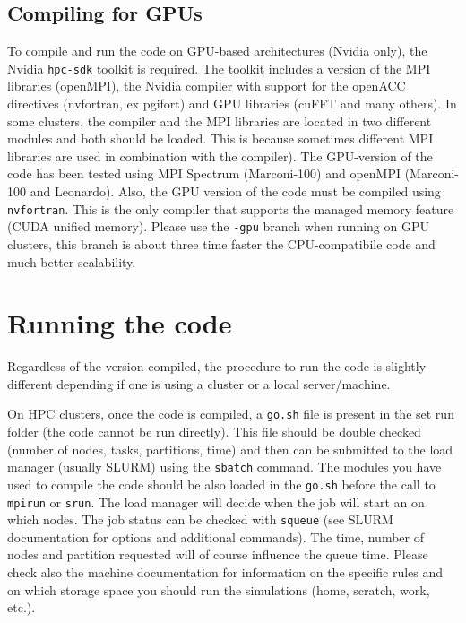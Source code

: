 \subsection{Compiling for GPUs}
To compile and run the code on GPU-based architectures (Nvidia only), the Nvidia \texttt{hpc-sdk} toolkit is required.
The toolkit includes a version of the MPI libraries (openMPI), the Nvidia compiler with support for the openACC directives (nvfortran, ex pgifort) and GPU libraries (cuFFT and many others).
In some clusters, the compiler and the MPI libraries are located in two different modules and both should be loaded.
This is because sometimes different MPI libraries are used in combination with the compiler). 
The GPU-version of the code has been tested using MPI Spectrum (Marconi-100) and openMPI (Marconi-100 and Leonardo).
Also, the GPU version of the code must be compiled using \texttt{nvfortran}.
This is the only compiler that supports the managed memory feature (CUDA unified memory).
Please use the  \texttt{-gpu} branch when running on GPU clusters, this branch is about three time faster the CPU-compatibile code and much better scalability.

\section{Running the code}

Regardless of the version compiled, the procedure to run the code is slightly different depending if one is using a cluster or a local server/machine.

On HPC clusters, once the code is compiled, a \texttt{go.sh} file is present in the set run folder (the code cannot be run directly).
This file should be double checked (number of nodes, tasks, partitions, time) and then can be submitted to the load manager (usually SLURM) using the \texttt{sbatch} command.
The modules you have used to compile the code should be also loaded in the \texttt{go.sh} before the call to \texttt{mpirun} or \texttt{srun}.
The load manager will decide when the job will start an on which nodes.
The job status can be checked with \texttt{squeue} (see SLURM documentation for options and additional commands).
The time, number of nodes and partition requested will of course influence the queue time.
Please check also the machine documentation for information on the specific rules and on which storage space you should run the simulations (home, scratch, work, etc.).

